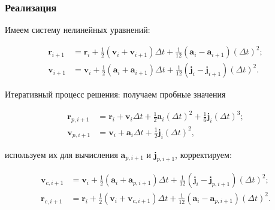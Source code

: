 \begin{frame}
\frametitle{Реализация}

Имеем систему нелинейных уравнений:

\su\su\su
\begin{equation}
\begin{split}
  \mathbf{r}_{i+1} & = \mathbf{r}_i + \tfrac{1}{2} (\mathbf{v}_i + \mathbf{v}_{i+1}) \Delta t + \tfrac{1}{12} (\mathbf{a}_i - \mathbf{a}_{i+1}) (\Delta t)^2; \\
  \mathbf{v}_{i+1} & = \mathbf{v}_i + \tfrac{1}{2} (\mathbf{a}_i + \mathbf{a}_{i+1}) \Delta t + \tfrac{1}{12} (\mathbf{j}_i - \mathbf{j}_{i+1}) (\Delta t)^2.
\end{split}
\end{equation}

Итеративный процесс решения: получаем пробные значения

\su\su\su
\begin{equation}
\begin{split}
  \mathbf{r}_{p, i+1} & = \mathbf{r}_i + \mathbf{v}_i \Delta t + \tfrac{1}{2} \mathbf{a}_i (\Delta t)^2 + \tfrac{1}{6} \mathbf{j}_i (\Delta t)^3; \\
  \mathbf{v}_{p, i+1} & = \mathbf{v}_i + \mathbf{a}_i \Delta t + \tfrac{1}{2} \mathbf{j}_i (\Delta t)^2,
\end{split}
\end{equation}

используем их для вычисления $ \mathbf{a}_{p, i+1} $ и $ \mathbf{j}_{p, i+1} $, корректируем:

\su\su\su
\begin{equation}
\begin{split}
  \mathbf{v}_{c, i+1} & = \mathbf{v}_i + \tfrac{1}{2} (\mathbf{a}_i + \mathbf{a}_{p, i+1}) \Delta t + \tfrac{1}{12} (\mathbf{j}_i - \mathbf{j}_{p, i+1}) (\Delta t)^2; \\
  \mathbf{r}_{c, i+1} & = \mathbf{r}_i + \tfrac{1}{2} (\mathbf{v}_i + \mathbf{v}_{c, i+1}) \Delta t + \tfrac{1}{12} (\mathbf{a}_i - \mathbf{a}_{p, i+1}) (\Delta t)^2.
\end{split}
\end{equation}

\end{frame}

\captionsetup{singlelinecheck=false, justification=justified}


